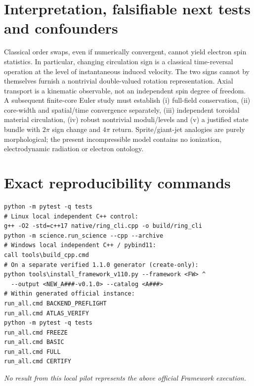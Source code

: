 \documentclass[10pt,a4paper]{article}
\begin{document}
\section{Interpretation, falsifiable next tests and confounders}
Classical order swaps, even if numerically convergent, cannot yield electron spin statistics. In particular, changing circulation sign is a classical time-reversal operation at the level of instantaneous induced velocity. The two signs cannot by themselves furnish a nontrivial double-valued rotation representation. Axial transport is a kinematic observable, not an independent spin degree of freedom. A subsequent finite-core Euler study must establish (i) full-field conservation, (ii) core-width and spatial/time convergence separately, (iii) independent toroidal material circulation, (iv) robust nontrivial moduli/levels and (v) a justified state bundle with $2\pi$ sign change and $4\pi$ return. Sprite/giant-jet analogies are purely morphological; the present incompressible model contains no ionization, electrodynamic radiation or electron ontology.

\section{Exact reproducibility commands}
\begin{verbatim}
python -m pytest -q tests
# Linux local independent C++ control:
g++ -O2 -std=c++17 native/ring_cli.cpp -o build/ring_cli
python -m science.run_science --cpp --archive
# Windows local independent C++ / pybind11:
call tools\build_cpp.cmd
# On a separate verified 1.1.0 generator (create-only):
python tools\install_framework_v110.py --framework <FW> ^
  --output <NEW_A###-v0.1.0> --catalog <A###>
# Within generated official instance:
run_all.cmd BACKEND_PREFLIGHT
run_all.cmd ATLAS_VERIFY
python -m pytest -q tests
run_all.cmd FREEZE
run_all.cmd BASIC
run_all.cmd FULL
run_all.cmd CERTIFY
\end{verbatim}
\noindent\emph{No result from this local pilot represents the above official Framework execution.}
\end{document}
